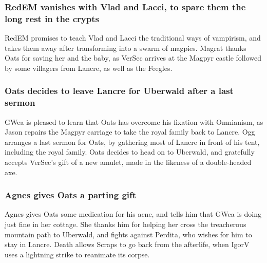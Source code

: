 \subsubsection{\Gls{RedEM} vanishes with \Gls{Vlad} and \Gls{Lacci}, to spare them the long rest
    in the crypts}
\Gls{RedEM} promises to teach \Gls{Vlad} and \Gls{Lacci} the traditional ways of vampirism, and
takes them away after transforming into a swarm of magpies. \Gls{Magrat} thanks \Gls{Oats} for
saving her and the baby, as \Gls{VerSec} arrives at the Magpyr castle followed by some villagers
from Lancre, as well as the Feegles.

\subsubsection{\Gls{Oats} decides to leave Lancre for Uberwald after a last sermon}
\Gls{GWea} is pleased to learn that \Gls{Oats} has overcome his fixation with Omnianism, as
\Gls{Jason} repairs the Magpyr carriage to take the royal family back to Lancre. \Gls{Ogg} arranges
a last sermon for \Gls{Oats}, by gathering most of Lancre in front of his tent, including the
royal family. \Gls{Oats} decides to head on to Uberwald, and gratefully accepts \Gls{VerSec}'s
gift of a new amulet, made in the likeness of a double-headed axe.

\subsubsection{\Gls{Agnes} gives \Gls{Oats} a parting gift}
\Gls{Agnes} gives \Gls{Oats} some medication for his acne, and tells him that \Gls{GWea} is doing
just fine in her cottage. She thanks him for helping her cross the treacherous mountain path to
Uberwald, and fights against \Gls{Perdita}, who wishes for him to stay in Lancre. \Gls{Death}
allows \Gls{Scraps} to go back from the afterlife, when \Gls{IgorV} uses a lightning strike to
reanimate its corpse.